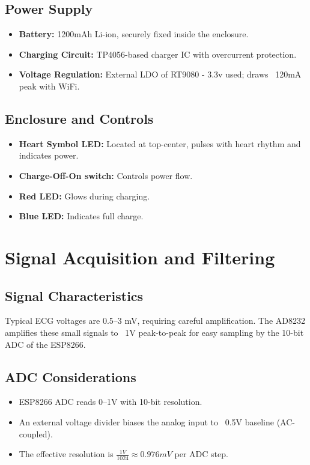 \section{Power Supply}
\begin{itemize}
    \item \textbf{Battery:} 1200mAh Li-ion, securely fixed inside the enclosure.
    \item \textbf{Charging Circuit:} TP4056-based charger IC with overcurrent protection.
    \item \textbf{Voltage Regulation:} External LDO of RT9080 - 3.3v used; draws ~120mA peak with WiFi.
\end{itemize}

\section{Enclosure and Controls}
\begin{itemize}
    \item \textbf{Heart Symbol LED:} Located at top-center, pulses with heart rhythm and indicates power.
    \item \textbf{Charge-Off-On switch:} Controls power flow.
    \item \textbf{Red LED:} Glows during charging.
    \item \textbf{Blue LED:} Indicates full charge.
\end{itemize}






\chapter{Signal Acquisition and Filtering}

\section{Signal Characteristics}
Typical ECG voltages are 0.5–3 mV, requiring careful amplification. The AD8232 amplifies these small signals to ~1V peak-to-peak for easy sampling by the 10-bit ADC of the ESP8266.

\section{ADC Considerations}
\begin{itemize}
    \item ESP8266 ADC reads 0–1V with 10-bit resolution.
    \item An external voltage divider biases the analog input to ~0.5V baseline (AC-coupled).
    \item The effective resolution is $\frac{1V}{1024} \approx 0.976mV$ per ADC step.
\end{itemize}

